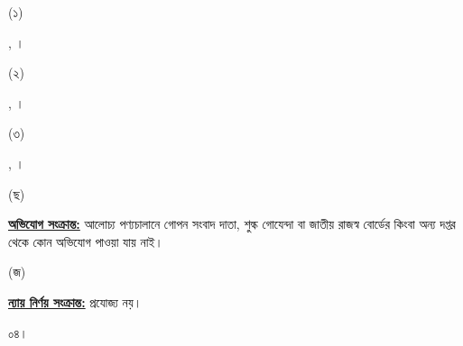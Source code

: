 \documentclass[12pt]{article}
\begin{document}
\begin{minipage}[t]{0.05\linewidth}
(১)
\end{minipage}
\begin{minipage}[t]{0.85\linewidth}
{\nbrosnt}, {\nbrosnd}।
\end{minipage}
\begin{minipage}[t]{0.1\linewidth}
\hspace{1em}
\end{minipage}
\begin{minipage}[t]{0.05\linewidth}
(২)
\end{minipage}
\begin{minipage}[t]{0.85\linewidth}
{\nbrfs}, {\nbrfsd}।
\end{minipage}
\begin{minipage}[t]{0.1\linewidth}
\hspace{1em}
\end{minipage}
\begin{minipage}[t]{0.05\linewidth}
(৩)
\end{minipage}
\begin{minipage}[t]{0.85\linewidth}
{\srooof}, {\srooofd}।
\\
\end{minipage}
\normalsize
\begin{minipage}[t]{0.05\linewidth}
\hspace{1em}
\end{minipage}
\begin{minipage}[t]{0.05\linewidth}
(ছ)
\end{minipage}
\begin{minipage}[t]{0.90\linewidth}
\underline{\textbf{অভিযোগ সংক্রান্ত:}} আলোচ্য পণ্যচালানে
গোপন সংবাদ দাতা, শুল্ক গোযেন্দা বা
জাতীয় রাজস্ব বোর্ডের কিংবা অন্য দপ্তর থেকে
কোন অভিযোগ পাওয়া যায় নাই।
\\
\end{minipage}
\begin{minipage}[t]{0.05\linewidth}
\hspace{1em}
\end{minipage}
\begin{minipage}[t]{0.05\linewidth}
(জ)
\end{minipage}
\begin{minipage}[t]{0.90\linewidth}
\underline{\textbf{ন্যায় নির্ণয় সংক্রান্ত:}} প্রযোজ্য নয়।
\\
\end{minipage}
\begin{minipage}[t]{0.05\linewidth}
০৪।
\end{minipage}
\end{document}
